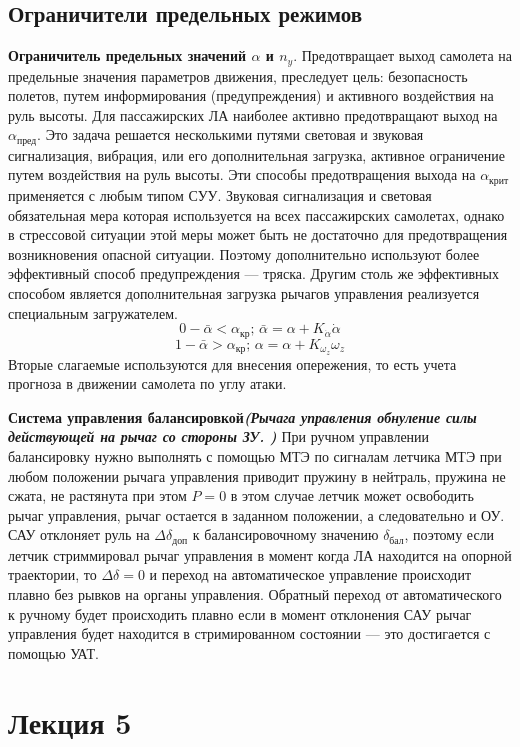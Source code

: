 \documentclass{article}
\begin{document}
\subsection{Ограничители предельных режимов}
\textbf{Ограничитель предельных значений $\alpha$ и $n_y$}.
Предотвращает выход самолета на предельные значения параметров движения,
преследует цель: безопасность полетов, путем информирования (предупреждения) и
активного воздействия на руль высоты.
Для пассажирских ЛА наиболее активно предотвращают выход на
$\alpha_\text{пред}$.
Это задача решается несколькими путями световая и звуковая сигнализация,
вибрация, или его дополнительная загрузка, активное ограничение путем
воздействия на руль высоты.
Эти способы предотвращения выхода на $\alpha_\text{крит}$ применяется с любым
типом СУУ. Звуковая сигнализация и световая обязательная мера которая
используется на всех пассажирских самолетах, однако в стрессовой ситуации этой
меры может быть не достаточно для предотвращения возникновения опасной ситуации.
Поэтому дополнительно используют более эффективный способ предупреждения ---
тряска. Другим столь же эффективных способом является дополнительная загрузка
рычагов управления реализуется специальным загружателем.
\[
	0 - \bar{\alpha} < \alpha_\text{кр}; \, \bar{\alpha} = \alpha +
	K_{\dot{\alpha}} \dot{\alpha}
\]
\[
	1 - \bar{\alpha} > \alpha_\text{кр}; \, \alpha = \alpha + K_{\omega_z}
	\omega_z
\]
Вторые слагаемые используются для внесения опережения, то есть учета прогноза в
движении самолета по углу атаки.

\textbf{Система управления балансировкой\emph{(Рычага управления обнуление силы
		действующей на рычаг со стороны ЗУ. )}}
При ручном управлении балансировку нужно выполнять с помощью МТЭ по сигналам
летчика МТЭ при любом положении рычага управления приводит пружину в нейтраль,
пружина не сжата, не растянута при этом $P=0$ в этом случае летчик может
освободить рычаг управления, рычаг остается в заданном положении, а
следовательно и ОУ.
САУ отклоняет руль на $\Delta\delta_\text{доп}$ к балансировочному значению
$\delta_\text{бал}$, поэтому если летчик стриммировал рычаг управления в момент
когда ЛА находится на опорной траектории, то $\Delta\delta = 0$ и переход на
автоматическое управление происходит плавно без рывков на органы управления.
Обратный переход от автоматического к ручному будет происходить плавно если в
момент отклонения САУ рычаг управления будет находится в стримированном
состоянии --- это достигается с помощью УАТ.

\newpage
\section{Лекция 5}
\end{document}
